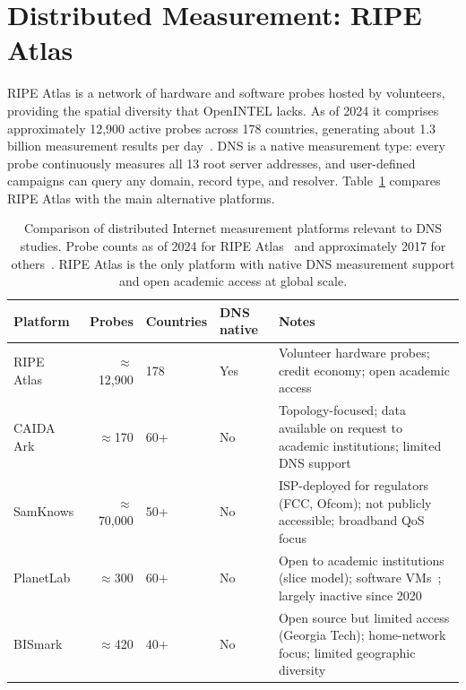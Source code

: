 \section{Distributed Measurement: RIPE Atlas}
\label{sec:2.3}

RIPE Atlas is a network of hardware and software probes hosted by volunteers, providing the spatial diversity that OpenINTEL lacks. As of 2024 it comprises approximately 12,900 active probes across 178 countries, generating about 1.3 billion measurement results per day~\cite{Nosyk2025}. \ac{DNS} is a native measurement type: every probe continuously measures all 13 root server addresses, and user-defined campaigns can query any domain, record type, and resolver. Table~\ref{tab:platforms} compares RIPE Atlas with the main alternative platforms.

\begin{table}[H]
\centering
\small
\begin{tabularx}{\linewidth}{p{2.6cm} r p{2.0cm} p{1.8cm} X}
\toprule
\textbf{Platform} & \textbf{Probes} & \textbf{Countries} & \textbf{\ac{DNS} native} & \textbf{Notes} \\
\midrule
RIPE Atlas       & $\approx$12,900 & 178 & Yes & Volunteer hardware probes; credit economy; open academic access~\cite{Nosyk2025} \\
CAIDA Ark        & $\approx$170    & 60+ & No  & Topology-focused; data available on request to academic institutions; limited \ac{DNS} support~\cite{Bajpai2017} \\
SamKnows         & $\approx$70,000 & 50+ & No  & \ac{ISP}-deployed for regulators (FCC, Ofcom); not publicly accessible; broadband QoS focus~\cite{Bajpai2017} \\
PlanetLab        & $\approx$300    & 60+ & No  & Open to academic institutions (slice model); software VMs~\cite{Cicalese2015}; largely inactive since 2020 \\
BISmark          & $\approx$420    & 40+ & No  & Open source but limited access (Georgia Tech); home-network focus; limited geographic diversity~\cite{Bajpai2017} \\
\bottomrule
\end{tabularx}
\caption{Comparison of distributed Internet measurement platforms relevant to \ac{DNS} studies. Probe counts as of 2024 for RIPE Atlas~\cite{Nosyk2025} and approximately 2017 for others~\cite{Bajpai2017}. RIPE Atlas is the only platform with native \ac{DNS} measurement support and open academic access at global scale.}
\label{tab:platforms}
\end{table}

